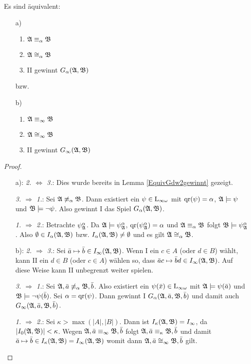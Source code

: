 \begin{satz}
	Es sind äquivalent:
	\begin{itemize}
	\item[a)]
	\begin{enumerate}
		\item $\mathfrak{A} \equiv_\alpha \mathfrak{B}$
		\item $\mathfrak{A} \cong_\alpha \mathfrak{B}$
		\item II gewinnt $G_\alpha(\mathfrak{A},\mathfrak{B})$
	\end{enumerate}
	bzw.
	\item[b)]
	\begin{enumerate}
		\item $\mathfrak{A} \equiv_\infty \mathfrak{B}$
		\item $\mathfrak{A} \cong_\infty \mathfrak{B}$
		\item II gewinnt $G_\infty(\mathfrak{A},\mathfrak{B})$
	\end{enumerate}
	\end{itemize}
\end{satz}
\begin{proof}
	\begin{itemize}
		\item[a):] \textit{2. $\Leftrightarrow$ 3.}: Dies wurde bereits in Lemma \ref{EquivGdw2gewinnt} gezeigt.
		
		\textit{3. $\Rightarrow$ 1.}: Sei $\mathfrak{A}\not\equiv_\alpha \mathfrak{B}$. Dann existiert ein $\psi\in \operatorname{L}_{\infty\omega}$ mit $\operatorname{qr}(\psi)=\alpha$, $\mathfrak{A}\models \psi$ und $\mathfrak{B}\models\neg\psi$. Also gewinnt I das Spiel $G_\alpha(\mathfrak{A},\mathfrak{B})$.
		
		\textit{1. $\Rightarrow$ 2.}: Betrachte $\psi^\alpha_{\mathfrak{A}}$. Da $\mathfrak{A}\models \psi^\alpha_{\mathfrak{A}}$, $\operatorname{qr}(\psi^\alpha_{\mathfrak{A}})=\alpha$ und $\mathfrak{A}\equiv_\alpha \mathfrak{B}$ folgt $\mathfrak{B}\models \psi^\alpha_{\mathfrak{A}}$. Also $\emptyset\in I_\alpha(\mathfrak{A},\mathfrak{B})$ bzw. $I_\alpha(\mathfrak{A},\mathfrak{B})\neq\emptyset$ und es gilt $\mathfrak{A} \cong_\alpha \mathfrak{B}$.
		
		\item[b):] \textit{2. $\Rightarrow$ 3.}: Sei $\bar{a}\mapsto\bar{b}\in I_\infty(\mathfrak{A},\mathfrak{B})$. Wenn I ein $c\in A$ (oder $d\in B$) wählt, kann II ein $d\in B$ (oder $c\in A$) wählen so, dass $\bar{a}c \mapsto \bar{b}d\in I_\infty(\mathfrak{A},\mathfrak{B})$. Auf diese Weise kann II unbegrenzt weiter spielen.
		
		\textit{3. $\Rightarrow$ 1.}: Sei $\mathfrak{A},\bar{a}\not\equiv_\alpha \mathfrak{B},\bar{b}$. Also existiert ein $\psi(\bar{x})\in \operatorname{L}_{\infty\omega}$ mit $\mathfrak{A}\models \psi(\bar{a})$ und $\mathfrak{B}\models \neg\psi(\bar{b})$. Sei $\alpha=\operatorname{qr}(\psi)$. Dann gewinnt I $G_\alpha(\mathfrak{A},\bar{a},\mathfrak{B},\bar{b})$ und damit auch $G_\infty(\mathfrak{A},\bar{a},\mathfrak{B},\bar{b})$.
		
		\textit{1. $\Rightarrow$ 2.}: Sei $\kappa > \max(\vert A \vert, \vert B \vert)$. Dann ist $I_\kappa(\mathfrak{A},\mathfrak{B})=I_\infty$, da $\vert I_0(\mathfrak{A},\mathfrak{B})| < \kappa$. Wegen $\mathfrak{A},\bar{a}\equiv_\infty \mathfrak{B},\bar{b}$ folgt $\mathfrak{A},\bar{a} \equiv_\kappa \mathfrak{B},\bar{b}$ und damit $\bar{a}\mapsto\bar{b}\in I_\kappa(\mathfrak{A},\mathfrak{B})=I_\infty(\mathfrak{A},\mathfrak{B})$ womit dann $\mathfrak{A},\bar{a}\cong_\infty \mathfrak{B},\bar{b}$ gilt.
	\end{itemize}
\end{proof}

